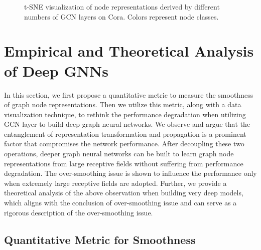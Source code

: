 \documentclass[sigconf]{acmart}
\begin{document}
\begin{figure*}
\centering
{}
\caption{t-SNE visualization of node representations derived by different numbers of GCN layers on Cora. Colors represent node classes.}
\label{fig:tsne1}
\end{figure*}


\section{Empirical and Theoretical Analysis of Deep GNNs}

In this section, we first propose a quantitative metric to
measure the smoothness of graph node representations. Then we
utilize this metric, along with a data visualization technique,
to rethink the performance degradation when utilizing GCN layer
to build deep graph neural networks. We observe and argue that
the entanglement of representation transformation and propagation is a
prominent factor that compromises the network performance. After
decoupling these two operations, deeper graph neural networks can be built to learn graph
node representations from large receptive fields without
suffering from performance degradation. The over-smoothing issue
is shown to influence the performance only when extremely large
receptive fields are adopted. Further, we provide a theoretical
analysis of the above observation when building very deep models,
which aligns with the conclusion of over-smoothing issue and can
serve as a rigorous description of the over-smoothing issue.

\subsection{Quantitative Metric for Smoothness}
\end{document}
